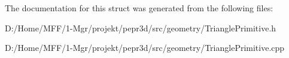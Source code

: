 The documentation for this struct was generated from the following files\+:\begin{DoxyCompactItemize}
\item 
D\+:/\+Home/\+M\+F\+F/1-\/\+Mgr/projekt/pepr3d/src/geometry/Triangle\+Primitive.\+h\item 
D\+:/\+Home/\+M\+F\+F/1-\/\+Mgr/projekt/pepr3d/src/geometry/Triangle\+Primitive.\+cpp\end{DoxyCompactItemize}
